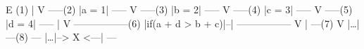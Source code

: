 \begin{minipage}[t]{2in}
\begin{AVerb}
         E (1)
         |
         V
       -----(2)
      |a = 1|
       -----
         V
       -----(3)
      |b = 2|
       -----
         V
       -----(4)
      |c = 3|
       -----
         V
       -----(5)
      |d = 4|
       -----
         |
         V
 -----------------(6)
|if(a + d > b + c)|--|
 -----------------   V
         |          ---(7)
         V         |\dots|
     ---(8)         ---
    |\dots|--> X <---|
     ---
\end{AVerb}
\end{minipage}






